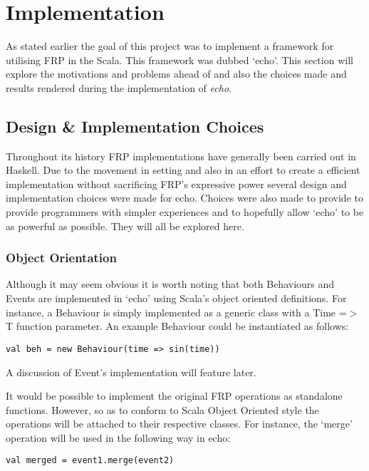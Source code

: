\chapter{Implementation}
  As stated earlier the goal of this project was to implement a framework for utilising FRP in the Scala. 
  This framework was dubbed `echo'. This section will explore the motivations and problems ahead of
  and also the choices made and results rendered during the implementation of \emph{echo}.
  
  \section{Design \& Implementation Choices}
  Throughout its history FRP implementations have generally been carried out in Haskell. Due to the movement
  in setting and also in an effort to create a efficient implementation without sacrificing FRP's expressive power
  several design and implementation choices were made for echo. Choices were also made
  to provide to provide programmers with simpler experiences and to hopefully allow `echo' to be
  as powerful as possible. They will all be explored here.
      
    \subsection{Object Orientation}
      Although it may seem obvious it is worth noting that both Behaviours and Events are implemented in
      `echo' using Scala's object oriented definitions. For instance, a Behaviour is simply
      implemented as a generic class with a Time =$>$ T function parameter. An example Behaviour
      could be instantiated as follows:
 
\begin{verbatim}
val beh = new Behaviour(time => sin(time))
\end{verbatim}  

      A discussion of Event's implementation will feature later.
      
      It would be possible to implement the original FRP operations as standalone functions. However, so
      as to conform to Scala Object Oriented style the operations will be attached to their respective
      classes. For instance, the `merge' operation will be used in the following way in echo:
      
\begin{verbatim}
val merged = event1.merge(event2)
\end{verbatim}

